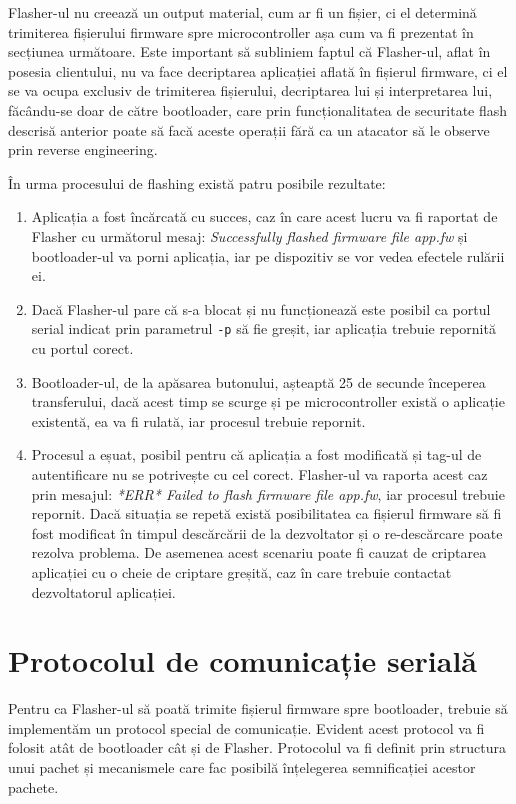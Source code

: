 \documentclass[12pt,a4paper,titlepage]{report}
\begin{document}
Flasher-ul nu creează un output material, cum ar fi un fișier, ci el determină trimiterea fișierului firmware spre microcontroller așa cum va fi prezentat în secțiunea următoare. Este important să subliniem faptul că Flasher-ul, aflat în posesia clientului, nu va face decriptarea aplicației aflată în fișierul firmware, ci el se va ocupa exclusiv de trimiterea fișierului, decriptarea lui și interpretarea lui, făcându-se doar de către bootloader, care prin funcționalitatea de securitate flash descrisă anterior poate să facă aceste operații fără ca un atacator să le observe prin reverse engineering.

În urma procesului de flashing există patru posibile rezultate:
\begin{enumerate}
\item Aplicația a fost încărcată cu succes, caz în care acest lucru va fi raportat de Flasher cu următorul mesaj: \textit{ Successfully flashed firmware file app.fw} și bootloader-ul va porni aplicația, iar pe dispozitiv se vor vedea efectele rulării ei.
\item Dacă Flasher-ul pare că s-a blocat și nu funcționează este posibil ca portul serial indicat prin parametrul \texttt{-p} să fie greșit, iar aplicația trebuie repornită cu portul corect.
\item Bootloader-ul, de la apăsarea butonului, așteaptă 25 de secunde începerea transferului, dacă acest timp se scurge și pe microcontroller există o aplicație existentă, ea va fi rulată, iar procesul trebuie repornit.
\item Procesul a eșuat, posibil pentru că aplicația a fost modificată și tag-ul de autentificare nu se potrivește cu cel corect. Flasher-ul va raporta acest caz prin mesajul: \textit{*ERR* Failed to flash firmware file app.fw}, iar procesul trebuie repornit. Dacă situația se repetă există posibilitatea ca fișierul firmware să fi fost modificat în timpul descărcării de la dezvoltator și o re-descărcare poate rezolva problema. De asemenea acest scenariu poate fi cauzat de criptarea aplicației cu o cheie de criptare greșită, caz în care trebuie contactat dezvoltatorul aplicației.
\end{enumerate}

\section{Protocolul de comunicație serială}

Pentru ca Flasher-ul să poată trimite fișierul firmware spre bootloader, trebuie să implementăm un protocol special de comunicație. Evident acest protocol va fi folosit atât de bootloader cât și de Flasher. Protocolul va fi definit prin structura unui pachet și mecanismele care fac posibilă înțelegerea semnificației acestor pachete.
\end{document}
